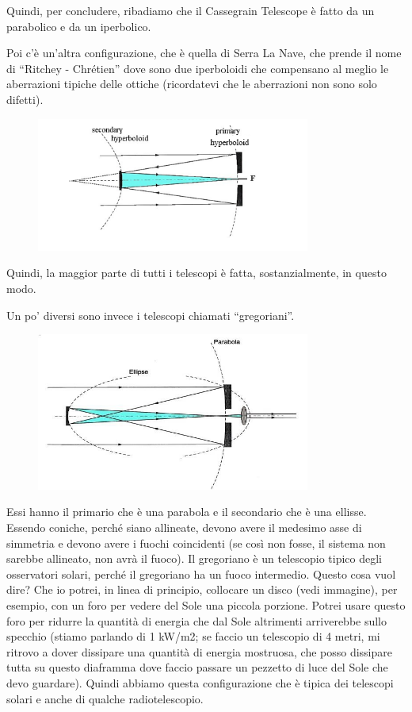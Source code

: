 \documentclass[a4paper,11pt]{article}
\begin{document}
Quindi, per concludere, ribadiamo che il Cassegrain Telescope è fatto da un parabolico e da un iperbolico. 

Poi c’è un’altra configurazione, che è quella di Serra La Nave, che prende il nome di “Ritchey - Chrétien” dove sono due iperboloidi che compensano al meglio le aberrazioni tipiche delle ottiche (ricordatevi che le aberrazioni non sono solo difetti). 

\begin{figure}[h!!]
        \centering
        \includegraphics[width=9cm]{4.png}
        \label{}
    \end{figure}

Quindi, la maggior parte di tutti i telescopi è fatta, sostanzialmente, in questo modo.

Un po’ diversi sono invece i telescopi chiamati “gregoriani”. 

\begin{figure}[h!!]
        \centering
        \includegraphics[width=9cm]{5.jpg}
        \label{}
    \end{figure}

Essi hanno il primario che è una parabola e il secondario che è una ellisse. Essendo coniche, perché siano allineate, devono avere il medesimo asse di simmetria e devono avere i fuochi coincidenti (se così non fosse, il sistema non sarebbe allineato, non avrà il fuoco). Il gregoriano è un telescopio tipico degli osservatori solari, perché il gregoriano ha un fuoco intermedio. Questo cosa vuol dire? Che io potrei, in linea di principio, collocare un disco (vedi immagine), per esempio, con un foro per vedere del Sole una piccola porzione. Potrei usare questo foro per ridurre la quantità di energia che dal Sole altrimenti arriverebbe sullo specchio (stiamo parlando di 1 kW/m2; se faccio un telescopio di 4 metri, mi ritrovo a dover dissipare una quantità di energia mostruosa, che posso dissipare tutta su questo diaframma dove faccio passare un pezzetto di luce del Sole che devo guardare). Quindi abbiamo questa configurazione che è tipica dei telescopi solari e anche di qualche radiotelescopio.\\
\end{document}
